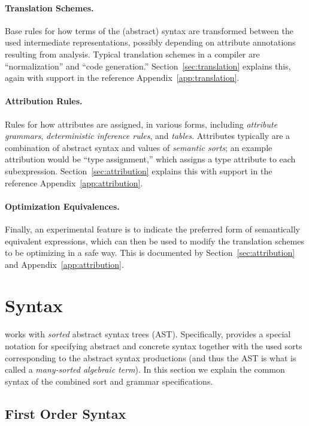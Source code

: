 \documentclass[11pt]{article} %
\begin{document}
\paragraph*{Translation Schemes.} Base rules for how terms of the (abstract) syntax are transformed
between the used intermediate representations, possibly depending on attribute annotations resulting
from analysis.  Typical translation schemes in a compiler are ``normalization'' and ``code
generation.''  Section~\ref{sec:translation} explains this, again with support in the reference
Appendix~\ref{app:translation}.

\paragraph*{Attribution Rules.} Rules for how attributes are assigned, in various forms, including
\emph{attribute grammars}, \emph{deterministic inference rules}, and \emph{tables}.  Attributes
typically are a combination of abstract syntax and values of \emph{semantic sorts}; an example
attribution would be ``type assignment,'' which assigns a type attribute to each subexpression.
Section~\ref{sec:attribution} explains this with support in the reference
Appendix~\ref{app:attribution}.

\paragraph*{Optimization Equivalences.} Finally, an experimental feature is to indicate the
preferred form of semantically equivalent expressions, which can then be used to modify the
translation schemes to be optimizing in a safe way.  This is documented by
Section~\ref{sec:attribution} and Appendix~\ref{app:attribution}.




\section{Syntax}
\label{sec:syntax}

\HAX works with \emph{sorted} abstract syntax trees (AST).  Specifically, \HAX provides a special
notation for specifying abstract and concrete syntax together with the used sorts corresponding to
the abstract syntax productions (and thus the AST is what is called a \emph{many-sorted algebraic
  term}).  In this section we explain the common syntax of the combined sort and grammar
specifications.

\subsection{First Order Syntax}
\end{document}
